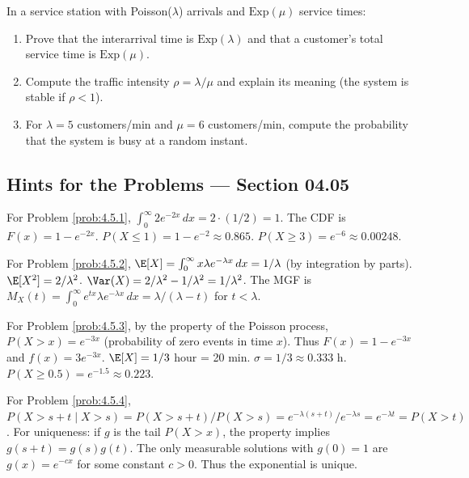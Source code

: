 \begin{problema}
	\label{prob:4.5.10}
	In a service station with Poisson($\lambda$) arrivals and $\text{Exp}(\mu)$ service times:
	\begin{enumerate}
		\item Prove that the interarrival time is $\text{Exp}(\lambda)$ and that a customer's total service time is $\text{Exp}(\mu)$.
		\item Compute the traffic intensity $\rho = \lambda/\mu$ and explain its meaning (the system is stable if $\rho < 1$).
		\item For $\lambda = 5$ customers/min and $\mu = 6$ customers/min, compute the probability that the system is busy at a random instant.
	\end{enumerate}
\end{problema}

\subsection*{Hints for the Problems --- Section 04.05}

\begin{sugerencia}
	\label{sug:4.5.1}
	For Problem \ref{prob:4.5.1}, $\int_{0}^{\infty} 2e^{-2x}\,dx = 2 \cdot (1/2) = 1$. The CDF is $F(x) = 1 - e^{-2x}$. $P(X \le 1) = 1 - e^{-2} \approx 0.865$. $P(X \ge 3) = e^{-6} \approx 0.00248$.
\end{sugerencia}

\begin{sugerencia}
	\label{sug:4.5.2}
	For Problem \ref{prob:4.5.2}, $\E[X] = \int_{0}^{\infty} x \lambda e^{-\lambda x}\,dx = 1/\lambda$ (by integration by parts). $\E[X^{2}] = 2/\lambda^{2}$. $\Var(X) = 2/\lambda^{2} - 1/\lambda^{2} = 1/\lambda^{2}$. The MGF is $M_{X}(t) = \int_{0}^{\infty} e^{tx} \lambda e^{-\lambda x}\,dx = \lambda/(\lambda - t)$ for $t < \lambda$.
\end{sugerencia}

\begin{sugerencia}
	\label{sug:4.5.3}
	For Problem \ref{prob:4.5.3}, by the property of the Poisson process, $P(X > x) = e^{-3x}$ (probability of zero events in time $x$). Thus $F(x) = 1 - e^{-3x}$ and $f(x) = 3e^{-3x}$. $\E[X] = 1/3$ hour = 20 min. $\sigma = 1/3 \approx 0.333$ h. $P(X \ge 0.5) = e^{-1.5} \approx 0.223$.
\end{sugerencia}

\begin{sugerencia}
	\label{sug:4.5.4}
	For Problem \ref{prob:4.5.4}, $P(X > s + t \mid X > s) = P(X > s + t)/P(X > s) = e^{-\lambda(s+t)}/e^{-\lambda s} = e^{-\lambda t} = P(X > t)$. For uniqueness: if $g$ is the tail $P(X > x)$, the property implies $g(s+t) = g(s) g(t)$. The only measurable solutions with $g(0) = 1$ are $g(x) = e^{-cx}$ for some constant $c > 0$. Thus the exponential is unique.
\end{sugerencia}

